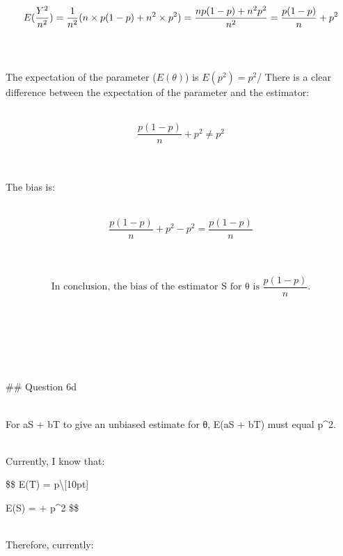 \documentclass[
]{article}
\begin{document}
\[
\Large
E(\frac{Y^2}{n^2}) = \frac{1}{n^2}(n\times p(1-p) + n^2 \times p^2) =  \frac{np(1-p) + n^2 p^2}{n^2} = \frac{p(1-p)}{n} + p^2
\]\\
\strut \\
The expectation of the parameter (\(E(θ)\)) is \(E(p^2) =  p^2\)/ There
is a clear difference between the expectation of the parameter and the
estimator:\\
\strut \\
\[
\frac{p(1-p)}{n} + p^2 \not= p^2
\]\\
\strut \\
The bias is:\\
\strut \\
\[
\frac{p(1-p)}{n} + p^2 - p^2 = \frac{p(1-p)}{n}
\]\\
\strut \\
\[
\text{In conclusion, the bias of the estimator S for θ is } \frac{p(1-p)}{n}.
\]\\
\strut \\
\strut \\
\strut \\
\#\# Question 6d\\
\strut \\
For aS + bT to give an unbiased estimate for θ, E(aS + bT) must equal
p\^{}2.\\
\strut \\
Currently, I know that:

\$\$ E(T) = p\textbackslash{[}10pt{]}

E(S) = + p\^{}2 \$\$\\
\strut \\
Therefore, currently:
\end{document}
